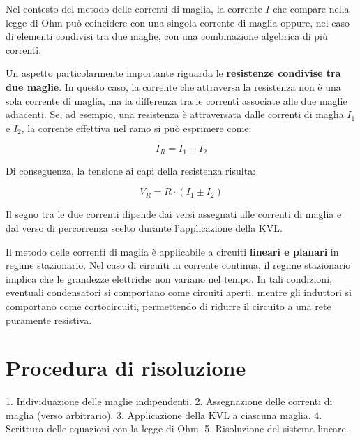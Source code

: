 Nel contesto del metodo delle correnti di maglia, la corrente $I$ che compare nella legge di Ohm può coincidere con una singola corrente di maglia oppure, nel caso di elementi condivisi tra due maglie, con una combinazione algebrica di più correnti.

Un aspetto particolarmente importante riguarda le \textbf{resistenze condivise tra due maglie}. In questo caso, la corrente che attraversa la resistenza non è una sola corrente di maglia, ma la differenza tra le correnti associate alle due maglie adiacenti. Se, ad esempio, una resistenza è attraversata dalle correnti di maglia $I_1$ e $I_2$, la corrente effettiva nel ramo si può esprimere come:

\begin{equation}
I_R = I_1 \pm I_2
\label{eq:res_condivisa}
\end{equation}

Di conseguenza, la tensione ai capi della resistenza risulta:

\begin{equation}
V_R = R \cdot (I_1 \pm I_2)
\label{eq:tensione_condivisa}
\end{equation}

Il segno tra le due correnti dipende dai versi assegnati alle correnti di maglia e dal verso di percorrenza scelto durante l'applicazione della KVL.

Il metodo delle correnti di maglia è applicabile a circuiti \textbf{lineari e planari} in regime stazionario. Nel caso di circuiti in corrente continua, il regime stazionario implica che le grandezze elettriche non variano nel tempo. In tali condizioni, eventuali condensatori si comportano come circuiti aperti, mentre gli induttori si comportano come cortocircuiti, permettendo di ridurre il circuito a una rete puramente resistiva.

\begin{center}
\end{center}



\section{Procedura di risoluzione}
1. Individuazione delle maglie indipendenti.  
2. Assegnazione delle correnti di maglia (verso arbitrario).  
3. Applicazione della KVL a ciascuna maglia.  
4. Scrittura delle equazioni con la legge di Ohm.  
5. Risoluzione del sistema lineare.

